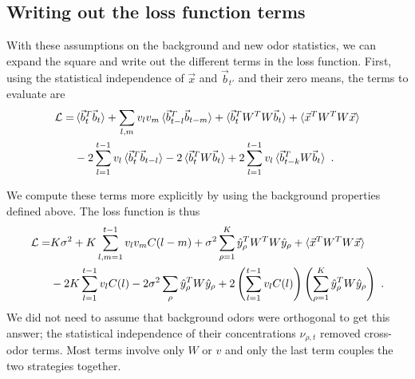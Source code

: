 \documentclass[letter, 12pt]{article}
\begin{document}
 \subsection{Writing out the loss function terms}
With these assumptions on the background and new odor statistics, we can expand the square and write out the different terms in the loss function. First, using the statistical independence of $\vec{x}$ and $\vec{b}_{t'}$ and their zero means, the terms to evaluate are
 \begin{align*}
 	\mathcal{L} =&  \braket{{\vec{b}_t}^T \vec{b}_t} + \sum_{l, m} v_l v_m \braket{{\vec{b}_{t-l}}^T \vec{b}_{t-m}} +  \braket{ {\vec{b}_t}^T W^T W \vec{b}_t} + \braket{{\vec{x}}^T W^T W \vec{x}} \nonumber \\
		& -2 \sum_{l=1}^{t-1} v_l \braket{{\vec{b}_t}^T \vec{b}_{t-l}} - 2 \braket{{\vec{b}_t}^T W \vec{b}_t} + 2 \sum_{l=1}^{t-1} v_l \braket{{\vec{b}_{t-k}}^T W \vec{b}_t}  \nonumber \,\, .
 \end{align*}
 
We compute these terms more explicitly by using the background properties defined above. The loss function is thus
\begin{align}
\mathcal{L} =& K \sigma^2 + K \sum_{l, m=1}^{t-1} v_l v_m C(l-m) + \sigma^2 \sum_{\rho=1}^K \hat{y}_{\rho}^T W^T W \hat{y}_{\rho} + \braket{\vec{x}^T W^T W \vec{x}} \nonumber \\
 &-2 K \sum_{l=1}^{t-1} v_l C(l) - 2 \sigma^2 \sum_{\rho} \hat{y}_{\rho}^T W \hat{y}_{\rho} + 2 \left(\sum_{l=1}^{t-1} v_l C(l) \right) \left(\sum_{\rho=1}^K \hat{y}_{\rho}^T W \hat{y}_{\rho} \right) 
 \,\, .
\label{eq:loss_function}
\end{align}
We did not need to assume that background odors were orthogonal to get this answer; the statistical independence of their concentrations $\nu_{\rho, t}$ removed cross-odor terms. Most terms involve only $W$ or $v$ and only the last term couples the two strategies together. 
\end{document}
